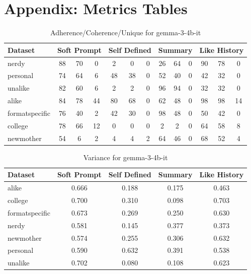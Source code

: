 \documentclass[11pt]{article}
\begin{document}
\clearpage
\section{Appendix: Metrics Tables}

\begin{table}[H]
\centering
\caption{Adherence/Coherence/Unique for gemma-3-4b-it}
\begin{tabular}{|l|ccc|ccc|ccc|ccc|}
\hline
\textbf{Dataset} & \multicolumn{3}{c|}{\textbf{Soft Prompt}} & \multicolumn{3}{c|}{\textbf{Self Defined}} & \multicolumn{3}{c|}{\textbf{Summary}} & \multicolumn{3}{c|}{\textbf{Like History}} \\
\hline
nerdy & 88 & 70 & 0 & 2 & 0 & 0 & 26 & 64 & 0 & 90 & 78 & 0 \\
\hline
personal & 74 & 64 & 6 & 48 & 38 & 0 & 52 & 40 & 0 & 42 & 32 & 0 \\
\hline
unalike & 82 & 60 & 6 & 2 & 2 & 0 & 96 & 94 & 0 & 32 & 32 & 0 \\
\hline
alike & 84 & 78 & 44 & 80 & 68 & 0 & 62 & 48 & 0 & 98 & 98 & 14 \\
\hline
formatspecific & 76 & 40 & 2 & 42 & 30 & 0 & 98 & 48 & 0 & 50 & 42 & 0 \\
\hline
college & 78 & 66 & 12 & 0 & 0 & 0 & 2 & 2 & 0 & 64 & 58 & 8 \\
\hline
newmother & 54 & 6 & 2 & 4 & 4 & 2 & 64 & 46 & 0 & 68 & 52 & 4 \\
\hline
\end{tabular}
\end{table}

\begin{table}[H]
    \centering
    \caption{Variance for gemma-3-4b-it}
    \begin{tabular}{|l|c|c|c|c|}
    \hline
    \textbf{Dataset} & \textbf{Soft Prompt} & \textbf{Self Defined} & \textbf{Summary} & \textbf{Like History} \\
    \hline
    alike & 0.666 & 0.188 & 0.175 & 0.463 \\
    \hline
    college & 0.700 & 0.310 & 0.098 & 0.703 \\
    \hline
    formatspecific & 0.673 & 0.269 & 0.250 & 0.630 \\
    \hline
    nerdy & 0.581 & 0.145 & 0.377 & 0.373 \\
    \hline
    newmother & 0.574 & 0.255 & 0.306 & 0.632 \\
    \hline
    personal & 0.590 & 0.632 & 0.391 & 0.538 \\
    \hline
    unalike & 0.702 & 0.080 & 0.108 & 0.623 \\
    \hline
    \end{tabular}
    \end{table}
\end{document}
